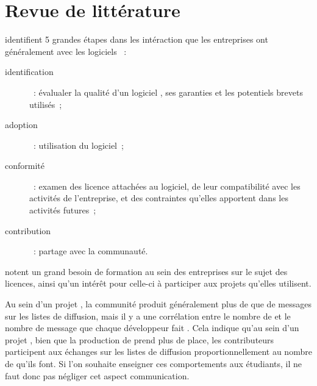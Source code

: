 \chapter{Revue de littérature}

 identifient 5 grandes étapes dans les intéraction que les entreprises ont
généralement avec les logiciels  :
\begin{description}
    \item[identification] : évalualer la qualité d'un logiciel , ses garanties et les potentiels
    brevets utilisés ;
    \item[adoption] : utilisation du logiciel ;
    \item[conformité] : examen des licence attachées au logiciel, de leur compatibilité avec les activités de
        l'entreprise, et des contraintes qu'elles apportent dans les activités futures ;
    \item[contribution] : partage avec la communauté.
\end{description}

\textcite{strategies-2012} notent un grand besoin de formation au sein des entreprises sur le sujet des
licences, ainsi qu'un intérêt pour celle-ci à participer aux projets qu'elles utilisent.

Au sein d'un projet , la communité produit généralement plus de  que de
messages sur les listes de diffusion, mais il y a une corrélation entre le nombre de  et le
nombre de message que chaque développeur fait . Cela indique qu'au
sein d'un projet , bien que la production de  prend plus de place, les
contributeurs participent aux échanges sur les listes de diffusion proportionnellement au nombre de
 qu'ils font. Si l'on souhaite enseigner ces comportements aux étudiants, il ne faut donc pas
négliger cet aspect communication.

